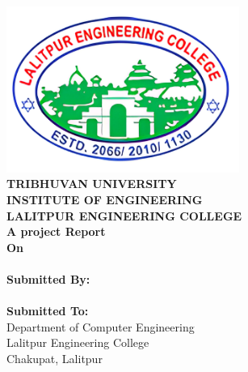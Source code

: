 \begin{center}

    \thispagestyle{empty}

    \includegraphics[width= 3in ]{img/leclogo21.png} \\
    \vspace{0.05 in}
    {\fontsize{12 pt}{12} \selectfont\textbf{TRIBHUVAN UNIVERSITY} \\
        \textbf{INSTITUTE OF ENGINEERING} \\
        \textbf{LALITPUR ENGINEERING COLLEGE}} \\

    \vspace{0.5 in}
    \textbf{A project Report}\\
    {\fontsize{12 pt}{12} \selectfont\textbf{On}\\}
    {\fontsize{12 pt}{12} \selectfont \textbf{\thetitle}}\\
    \vspace{0.8 in}
    \textbf{ Submitted By:}  \\
    {\theauthor} \\
    \vspace{0.8 in}
    \textbf{ Submitted To:}  \\
    Department of Computer Engineering \\
    Lalitpur Engineering College \\
    Chakupat, Lalitpur \\
    \vspace{0.7 in}
    \thedate
\end{center}